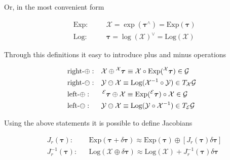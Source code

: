 Or, in the most convenient form

\begin{equation}
    \begin{aligned}
        \label{eqn:big_exp_log_for_r_m}
        & \text{Exp} : \quad && \mathcal{X} 
        = \exp(\boldsymbol{\tau}^\wedge) 
        = \text{Exp}(\boldsymbol{\tau})\\
        & \text{Log} : \quad && \boldsymbol{\tau} 
        = \log(\mathcal{X})^\vee
        = \text{Log}(\mathcal{X})
    \end{aligned}
\end{equation}

Through this definitions it easy to introduce plus and minus operations

\begin{equation}
    \begin{aligned}
        & \text{right-} \oplus: &&
        \mathcal{X} \oplus \prescript{\mathcal{X}}{}{\boldsymbol{\tau}} 
        \equiv \mathcal{X} \circ 
        \text{Exp}(\prescript{\mathcal{X}}{}{\boldsymbol{\tau}}) \in 
        \mathcal{G} \\
        & \text{right-} \ominus: &&
        \mathcal{Y} \ominus \mathcal{X} 
        \equiv \text{Log}(\mathcal{X}^{-1} \circ \mathcal{Y}) 
        \in T_{\mathcal{X}}\mathcal{G} \\
        & \text{left-} \oplus: &&
        \prescript{\mathcal{E}}{}{\boldsymbol{\tau}} \oplus \mathcal{X}
        \equiv \text{Exp}(\prescript{\mathcal{E}}{}{\boldsymbol{\tau}}) 
        \circ \mathcal{X} \in \mathcal{G} \\ 
        & \text{left-} \ominus: &&
        \mathcal{Y} \ominus \mathcal{X} \equiv
        \text{Log}(\mathcal{Y} \circ \mathcal{X}^{-1}) 
        \in T_{\mathcal{E}}\mathcal{G}
    \end{aligned}
\end{equation}

Using the above statements it is possible to define Jacobians

\begin{equation}
    \begin{aligned}
        & J_r(\boldsymbol{\tau}): &&
        \text{Exp}(\boldsymbol{\tau} + \delta \boldsymbol{\tau})
        \approx
        \text{Exp}(\boldsymbol{\tau}) \oplus 
        [J_r(\boldsymbol{\tau}) \delta \boldsymbol{\tau}] \\ 
        & J_r^{-1}(\boldsymbol{\tau}): &&
        \text{Log}(\mathcal{X} \oplus \delta \boldsymbol{\tau}) 
        \approx
        \text{Log}(\mathcal{X}) + 
        J_r^{-1}(\boldsymbol{\tau}) \delta \boldsymbol{\tau}
    \end{aligned}
\end{equation}

